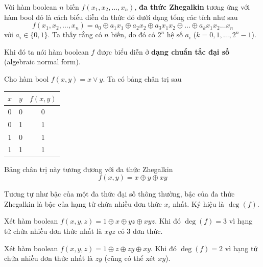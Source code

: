 \begin{definition}
    Với hàm boolean $n$ biến $f(x_1, x_2, \ldots, x_n)$, \textbf{đa thức Zhegalkin} tương ứng với hàm bool đó là cách biểu diễn
    đa thức đó dưới dạng tổng các tích như sau
    \begin{equation}
        f(x_1, x_2, \ldots, x_n) = a_0 \oplus a_1 x_1 
        \oplus a_2 x_2 \oplus a_3 x_1 x_2 \oplus \ldots 
        \oplus a_k x_1 x_2 \ldots x_n
    \end{equation}
    với $a_i \in \{0, 1\}$. Ta thấy rằng có $n$ biến, do đó có 
    $2^n$ hệ số $a_i$ ($k = 0, 1, \ldots, 2^n-1$).
\end{definition}

Khi đó ta nói hàm boolean $f$ được biểu diễn ở \textbf{dạng chuẩn tắc đại số} (algebraic normal form).

\begin{example}
    Cho hàm bool $f(x, y) = x \vee y$. Ta có bảng chân trị sau
    \begin{table}[ht]
        \centering
        \begin{tabular}{|c|c|c|}
            \hline
            $x$ & $y$ & $f(x, y)$ \\ \hline
            0 & 0 & 0 \\ \hline
            0 & 1 & 1 \\ \hline
            1 & 0 & 1 \\ \hline
            1 & 1 & 1 \\ \hline
        \end{tabular}
    \end{table}

    Bảng chân trị này tương đương với đa thức Zhegalkin
    \[f(x, y) = x \oplus y \oplus xy\]
\end{example}

\begin{definition}
    Tương tự như bậc của một đa thức đại số thông thường,
    bậc của đa thức Zhegalkin là bậc của hạng tử chứa nhiều
    đơn thức $x_i$ nhất. Ký hiệu là $\deg(f)$.
\end{definition}

\begin{example}
    Xét hàm boolean $f(x, y, z) = 1 \oplus x \oplus yz \oplus xyz$.
    Khi đó $\deg(f) = 3$ vì hạng tử chứa nhiều đơn thức nhất là $xyz$
    có 3 đơn thức.

    Xét hàm boolean $f(x, y, z) = 1 \oplus z \oplus zy \oplus xy$. 
    Khi đó $\deg(f) = 2$ vì hạng tử chứa nhiều đơn thức nhất là
    $zy$ (cũng có thể xét $xy$).
\end{example}

